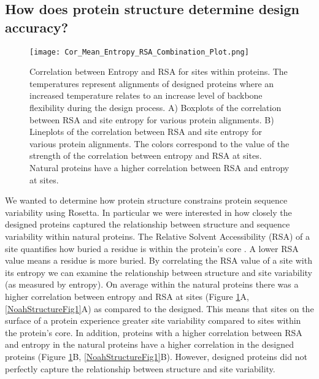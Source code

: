\documentclass[12pt]{article}
\begin{document}
\subsection{How does protein structure determine design accuracy?}
\label{ProteinStructure}

\begin{figure}[H]
\centering
\centerline{\texttt{[image: Cor\_Mean\_Entropy\_RSA\_Combination\_Plot.png]}}
\caption{Correlation between Entropy and RSA for sites within proteins.  The temperatures represent alignments of designed proteins where an increased temperature relates to an increase level of backbone flexibility during the design process. A) Boxplots of the correlation between RSA and site entropy for various protein alignments. B) Lineplots of the correlation between RSA and site entropy for various protein alignments. The colors correspond to the value of the strength of the correlation between entropy and RSA at sites. Natural proteins have a higher correlation between RSA and entropy at sites.}
\label{StructureFig1}
\end{figure}

\par We wanted to determine how protein structure constrains protein sequence variability using Rosetta. In particular we were interested in how closely the designed proteins captured the relationship between structure and sequence variability within natural proteins. The Relative Solvent Accessibility (RSA) of a site quantifies how buried a residue is within the protein's core \cite{Franzosa2009}.  A lower RSA value means a residue is more buried. By correlating the RSA value of a site with its entropy we can examine the relationship between structure and site variability (as measured by entropy).  On average within the natural proteins there was a higher correlation between entropy and RSA at sites (Figure \ref{StructureFig1}A, \ref{NoahStructureFig1}A) as compared to the designed. This means that sites on the surface of a protein experience greater site variability compared to sites within the protein's core. In addition, proteins with a higher correlation between RSA and entropy in the natural proteins have a higher correlation in the designed proteins (Figure \ref{StructureFig1}B, \ref{NoahStructureFig1}B). However, designed proteins did not perfectly capture the relationship between structure and site variability. 
\end{document}
